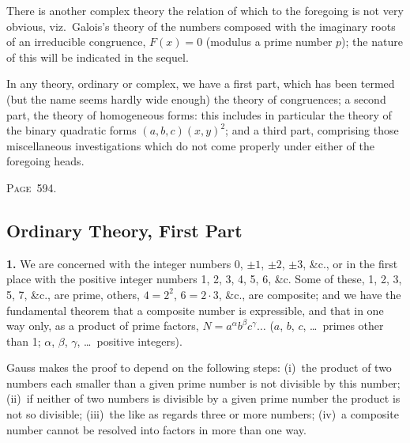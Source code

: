 \documentclass[11pt,a4paper]{book}
\begin{document}
There is another complex theory the relation of which to the foregoing is not very obvious, viz.\ Galois's theory of the numbers composed with the imaginary roots of an irreducible congruence, $F(x)=0$ (modulus a prime number $p$); the nature of this will be indicated in the sequel.

In any theory, ordinary or complex, we have a first part, which has been termed (but the name seems hardly wide enough) the theory of congruences; a second part, the theory of homogeneous forms: this includes in particular the theory of the binary quadratic forms $(a,b,c)(x,y)^2$; and a third part, comprising those miscellaneous investigations which do not come properly under either of the foregoing heads.

\newpage
\noindent\textsc{Page~594.} \subsection*{Ordinary Theory, First Part}

\textbf{1.} We are concerned with the integer numbers 0, $\pm 1$, $\pm 2$, $\pm 3$, \&c., or in the first place with the positive integer numbers 1, 2, 3, 4, 5, 6, \&c. Some of these, 1, 2, 3, 5, 7, \&c., are prime, others, $4=2^2$, $6=2\cdot 3$, \&c., are composite; and we have the fundamental theorem that a composite number is expressible, and that in one way only, as a product of prime factors, $N=a^\alpha b^\beta c^\gamma\ldots$ ($a$, $b$, $c$, \ldots\ primes other than 1; $\alpha$, $\beta$, $\gamma$, \ldots\ positive integers).

Gauss makes the proof to depend on the following steps: (i)~the product of two numbers each smaller than a given prime number is not divisible by this number; (ii)~if neither of two numbers is divisible by a given prime number the product is not so divisible; (iii)~the like as regards three or more numbers; (iv)~a composite number cannot be resolved into factors in more than one way.
\end{document}
